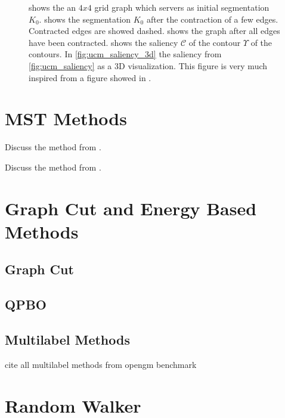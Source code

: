 \begin{figure}
{{    }%
    }%
    \caption[Ultra metric contour map saliency]{
         shows the an $4x4$ grid graph which servers as initial segmentation $K_0$.
         shows the segmentation $K_0$ after the contraction of a few edges.
        Contracted edges are showed dashed.
         shows the graph after all edges have been contracted.
         shows the saliency $\mathcal{C}$ of the contour $\Upsilon$ of the contours.
        In \cref{fig:ucm_saliency_3d} the saliency from \ref{fig:ucm_saliency} as a 3D visualization.
        This figure is very much inspired from a figure showed in \citep{arbelaez_2006_cvpr}.
    }\label{fig:ucm_visu}
\end{figure}









\section{MST Methods}\label{sec:rw_mst_methods}


Discuss the method from \citet{felzenszwalb_2004_ijcv}.


Discuss the method from \citet{Straehle_k-smallestspanning}.


\section{Graph Cut and Energy Based Methods}

\subsection{Graph Cut}

\subsection{QPBO}

\subsection{Multilabel Methods}

    cite all multilabel methods from opengm benchmark


\section{Random Walker}\label{sec:rw_random_walker}



